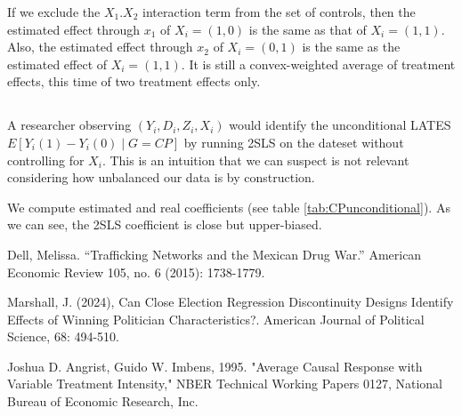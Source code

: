 \documentclass{article}
\begin{document}
If we exclude the \(X_1.X_2\) interaction term from the set of controls, then the estimated effect through \(x_1\) of \(X_i=(1,0)\) is the same as that of \(X_i=(1,1)\). Also, the estimated effect through \(x_2\) of \(X_i=(0,1)\) is the same as the estimated effect of \(X_i=(1,1)\). It is still a convex-weighted average of treatment effects, this time of two treatment effects only.

\subsection{}



A researcher observing \((Y_i,D_i,Z_i,X_i)\) would identify the unconditional LATES \(E[Y_i(1)-Y_i(0) \mid G = CP]\) by running 2SLS on the dateset without controlling for \(X_i\). This is an intuition that we can suspect is not relevant considering how unbalanced our data is by construction.

We compute estimated and real coefficients (see table \ref{tab:CPunconditional}). As we can see, the 2SLS coefficient is close but upper-biased.


\begin{thebibliography}{9}

Dell, Melissa. “Trafficking Networks and the Mexican Drug War.” American Economic Review 105, no. 6 (2015): 1738-1779.

Marshall, J. (2024), Can Close Election Regression Discontinuity Designs Identify Effects of Winning Politician Characteristics?. American Journal of Political Science, 68: 494-510.

Joshua D. Angrist, Guido W. Imbens, 1995. "Average Causal Response with Variable Treatment Intensity," NBER Technical Working Papers 0127, National Bureau of Economic Research, Inc.

\end{thebibliography}
\end{document}
